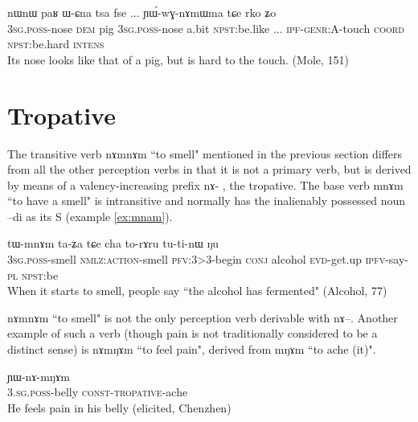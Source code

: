 \documentclass[oldfontcommands,oneside,a4paper,11pt]{article}
\newcommand{\ipa}[1]{{\phon #1}} %
\begin{document}
 \begin{exe}
\ex \label{ex:namwma}
\gll \ipa{ɯ-ɕna}  	\ipa{nɯnɯ}  	\ipa{paʁ}  	\ipa{ɯ-ɕna}  	\ipa{tsa}  	\ipa{fse}  ...	\ipa{ɲɯ́-wɣ-nɤmɯma}  	\ipa{tɕe}  	\ipa{rko}  	\ipa{ʑo}   	\\
\textsc{3sg.poss}-nose \textsc{dem} pig \textsc{3sg.poss}-nose  a.bit \textsc{npst}:be.like ... \textsc{ipf-genr:A}-touch \textsc{coord} \textsc{npst}:be.hard \textsc{intens} \\
 \glt  Its nose looks like that of a pig, but is hard to the touch. (Mole, 151)
\end{exe} 






\section{Tropative} \label{sec:tropative}
The transitive verb \ipa{nɤmnɤm} ``to smell" mentioned in the previous section differs from all the other perception verbs in that it is not a primary verb, but is derived by means of a valency-increasing prefix \ipa{nɤ-} , the tropative. The base verb \ipa{mnɤm} ``to have a smell" is intransitive and normally has the inalienably possessed noun \ipa{--di} as its S (example \ref{ex:mnam}).
 \begin{exe}
\ex \label{ex:mnam}
\gll \ipa{ɯ-di}   	\ipa{tɯ-mnɤm}   	\ipa{ta-ʑa}   	\ipa{tɕe}   	\ipa{cha}   	\ipa{to-rɤru}   	\ipa{tu-ti-nɯ}   	\ipa{ŋu}   \\
\textsc{3sg.poss}-smell \textsc{nmlz:action}-smell \textsc{pfv:3>3}-begin \textsc{conj} alcohol \textsc{evd}-get.up \textsc{ipfv}-say-\textsc{pl} \textsc{npst}:be \\
\glt When it starts to smell, people say ``the alcohol has fermented" (Alcohol, 77)
\end{exe} 

\ipa{nɤmnɤm} ``to smell" is not the only perception verb derivable with \ipa{nɤ}--. Another example of such a verb (though pain is not traditionally considered to be a distinct sense) is \ipa{nɤmŋɤm} ``to feel pain", derived from \ipa{mŋɤm} ``to ache (it)".

 \begin{exe}
\ex \label{ex:namNam2}
\gll  \ipa{ɯ-xtu} \ipa{ɲɯ-nɤ-mŋɤm}  \\
\textsc{3.sg.poss}-belly \textsc{const}-\textsc{tropative}-ache \\
\glt  He feels pain in his belly (elicited, Chenzhen)
\end{exe}
\end{document}
